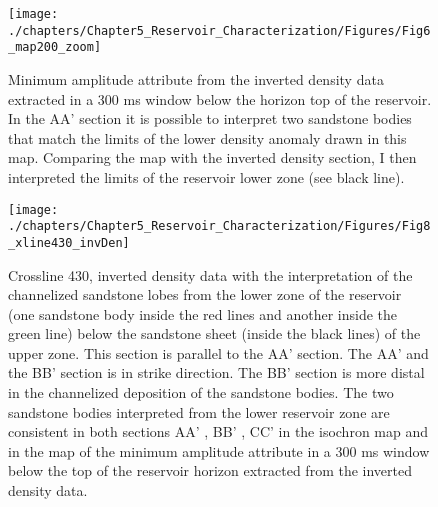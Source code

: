 \begin{figure}[hbtp]
	\begin{center}
	\texttt{[image: ./chapters/Chapter5\_Reservoir\_Characterization/Figures/Fig6\_map200\_zoom]}
			\caption[Minimum amplitude attribute from the inverted density data extracted in a 300 ms window below the horizon top of the reservoir.]{Minimum amplitude attribute from the inverted density data extracted in a 300 ms window below the horizon top of the reservoir. In the AA' section it is possible to interpret two sandstone bodies that match the limits of the lower density anomaly drawn in this map. Comparing the map with the inverted density section, I then interpreted the limits of the reservoir lower zone (see black line). }
			\label{fig:map_200}
		\end{center}
	\end{figure}


	





\begin{figure}[hbtp]
	\begin{center}
	\texttt{[image: ./chapters/Chapter5\_Reservoir\_Characterization/Figures/Fig8\_xline430\_invDen]}
			\caption[Crossline 430, inverted density data with the interpretation of the channelized sandstone lobes from the lower zone of the reservoir below the sandstone sheet of the upper zone.]{Crossline 430, inverted density data with the interpretation of the channelized sandstone lobes from the lower zone of the reservoir (one sandstone body inside the red lines and another inside the green line) below the sandstone sheet (inside the black lines) of the upper zone. This section is parallel to the AA' section. The AA' and the BB' section is in strike direction. The BB' section is more distal in the channelized deposition of the sandstone bodies. The two sandstone bodies interpreted from the lower reservoir zone are consistent in both sections AA' , BB' , CC'  in the isochron map and in the map of the minimum amplitude attribute in a 300 ms window below the top of the reservoir horizon extracted from the inverted density data.  }
			\label{fig:xline430_invDen}
		\end{center}
	\end{figure}



